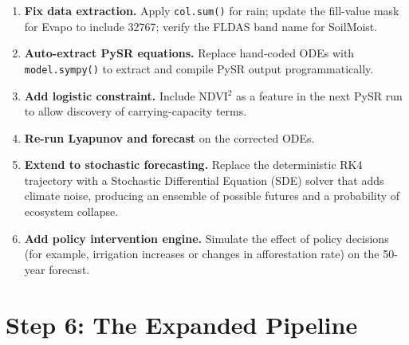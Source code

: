 \documentclass[12pt, a4paper]{article}
\begin{document}
\begin{enumerate}
    \item \textbf{Fix data extraction.} Apply \texttt{col.sum()} for rain;
    update the fill-value mask for Evapo to include 32767; verify the
    FLDAS band name for SoilMoist.
    \item \textbf{Auto-extract PySR equations.} Replace hand-coded ODEs
    with \texttt{model.sympy()} to extract and compile PySR output
    programmatically.
    \item \textbf{Add logistic constraint.} Include NDVI$^2$ as a feature
    in the next PySR run to allow discovery of carrying-capacity terms.
    \item \textbf{Re-run Lyapunov and forecast} on the corrected ODEs.
    \item \textbf{Extend to stochastic forecasting.} Replace the
    deterministic RK4 trajectory with a Stochastic Differential Equation
    (SDE) solver that adds climate noise, producing an ensemble of possible
    futures and a probability of ecosystem collapse.
    \item \textbf{Add policy intervention engine.} Simulate the effect of
    policy decisions (for example, irrigation increases or changes in
    afforestation rate) on the 50-year forecast.
\end{enumerate}


\section{Step 6: The Expanded Pipeline}
\end{document}
